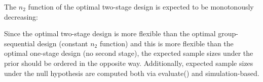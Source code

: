 \documentclass[
]{book}
\newenvironment{Shaded}{\begin{snugshade}}{\end{snugshade}}
\newcommand{\CommentTok}[1]{\textcolor[rgb]{0.56,0.35,0.01}{\textit{#1}}}
\newcommand{\DecValTok}[1]{\textcolor[rgb]{0.00,0.00,0.81}{#1}}
\newcommand{\FunctionTok}[1]{\textcolor[rgb]{0.00,0.00,0.00}{#1}}
\newcommand{\NormalTok}[1]{#1}
\newcommand{\SpecialCharTok}[1]{\textcolor[rgb]{0.00,0.00,0.00}{#1}}
\newcommand{\StringTok}[1]{\textcolor[rgb]{0.31,0.60,0.02}{#1}}
\begin{document}
The \(n_2\) function of the optimal two-stage design is expected to be monotonously decreasing:

\begin{Shaded}
\end{Shaded}

Since the optimal two-stage design is more flexible than the optimal group-sequential design (constant
\(n_2\) function) and this is more flexible than the optimal one-stage design (no second stage), the expected sample sizes under the prior should be ordered in the opposite way. Additionally, expected sample sizes under the null hypothesis are computed both via evaluate() and simulation-based.
\end{document}
